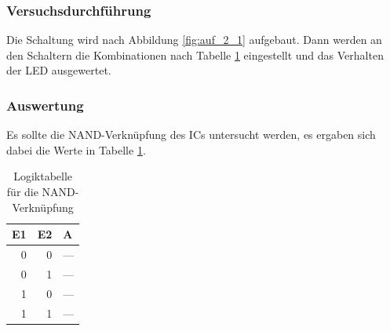 \documentclass[12pt,a4paper]{article}
\begin{document}
\subsubsection*{Versuchsdurchführung}

Die Schaltung wird nach Abbildung \ref{fig:auf_2_1} aufgebaut. Dann werden an den Schaltern die Kombinationen nach Tabelle \ref{tab:2_1} eingestellt und das Verhalten der LED ausgewertet.

\subsubsection*{Auswertung}

Es sollte die NAND-Verknüpfung des ICs untersucht werden, es ergaben sich dabei die Werte in Tabelle \ref{tab:2_1}.

\begin{table}[H]
\begin{center}
\begin{tabular}{r|r|l}

\multicolumn{1}{l|}{E1} & \multicolumn{1}{l|}{E2} & A \\ \hline \hline
0 & 0 & --- \\ 
0 & 1 & --- \\ 
1 & 0 & --- \\ 
1 & 1 & --- \\ 
\end{tabular}
\end{center}
\caption{Logiktabelle für die NAND-Verknüpfung}
\label{tab:2_1}
\end{table}
\end{document}
